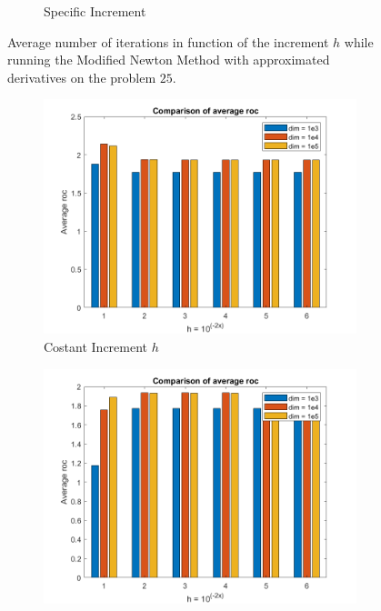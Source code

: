 \begin{figure}[htbp]
\begin{subfigure}[t]{0.45\textwidth}
        \caption{Specific Increment}
    \end{subfigure}
    \caption{ \small Average number of iterations in function of the increment $h$  while running the Modified Newton Method with approximated derivatives on the problem $25$.}
\end{figure}


\begin{figure}[htbp]
    \centering
    \begin{subfigure}[t]{0.45\textwidth}  %
        \centering
        \includegraphics[width=\textwidth]{img/pb76_MN_difffinite_COST_rateofconv.png}
        \caption{Costant Increment $h$}
    \end{subfigure}
    \hspace{1cm} %
    \begin{subfigure}[t]{0.45\textwidth}
        \centering
        \includegraphics[width=\textwidth]{img/pb76_MN_difffinite_REL_rateofconv.png}

\end{subfigure}
\end{figure}
